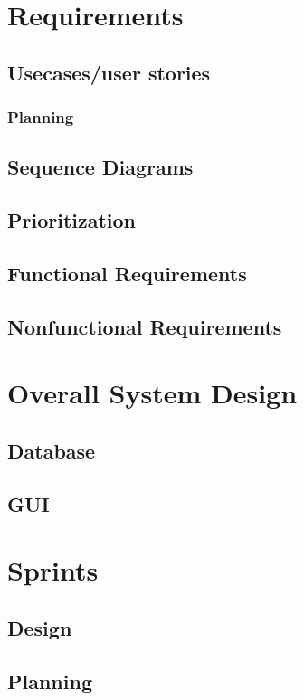 \documentclass[10pt,a4paper,oneside]{report}
\begin{document}

\clearpage


\chapter{Requirements}
\section{Usecases/user stories}
\subsection{Planning}
\section{Sequence Diagrams}
\section{Prioritization}
\section{Functional Requirements}
\section{Nonfunctional Requirements}



\chapter{Overall System Design}
\section{Database}
\section{GUI}

\chapter{Sprints}
\section{Design}
\section{Planning}
\end{document}
